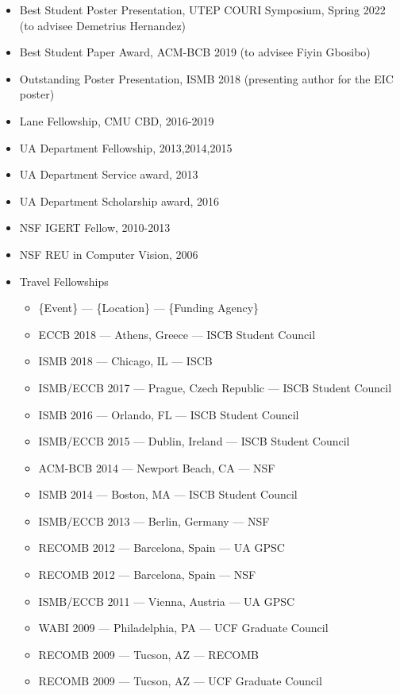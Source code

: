 \documentclass[10pt,letterpaper]{article}
\begin{document}
\begin{itemize}
    \item Best Student Poster Presentation, UTEP COURI Symposium, Spring 2022 (to advisee Demetrius Hernandez)
    \item Best Student Paper Award, ACM-BCB 2019 (to advisee Fiyin Gbosibo)
    \item Outstanding Poster Presentation, ISMB 2018 (presenting author for the EIC poster)
    \item Lane Fellowship, CMU CBD, 2016-2019
    \item UA Department Fellowship, 2013,2014,2015
    \item UA Department Service award, 2013
    \item UA Department Scholarship award, 2016
    \item NSF IGERT Fellow, 2010-2013
    \item NSF REU in Computer Vision, 2006
    \item Travel Fellowships
    \begin{itemize}
    	\item \{Event\} --- \{Location\} --- \{Funding Agency\}
    	\item ECCB 2018 --- Athens, Greece --- ISCB Student Council
    	\item ISMB 2018 --- Chicago, IL --- ISCB
	\item ISMB/ECCB 2017 --- Prague, Czech Republic --- ISCB Student Council 
	\item ISMB 2016 --- Orlando, FL --- ISCB Student Council
	\item ISMB/ECCB 2015 --- Dublin, Ireland --- ISCB Student Council
	\item ACM-BCB 2014 --- Newport Beach, CA --- NSF
	\item ISMB 2014 --- Boston, MA --- ISCB Student Council 
	\item ISMB/ECCB 2013 --- Berlin, Germany --- NSF
	\item RECOMB 2012 --- Barcelona, Spain --- UA GPSC
	\item RECOMB 2012 --- Barcelona, Spain --- NSF
	\item ISMB/ECCB 2011 --- Vienna, Austria --- UA GPSC
	\item WABI 2009 --- Philadelphia, PA --- UCF Graduate Council 
	\item RECOMB 2009 --- Tucson, AZ --- RECOMB
	\item RECOMB 2009 --- Tucson, AZ --- UCF Graduate Council
    \end{itemize}
\end{itemize}
\end{document}
